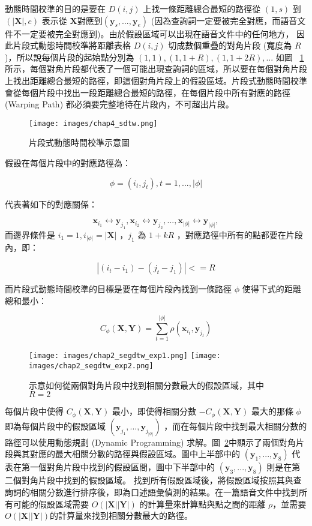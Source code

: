 動態時間校準的目的是要在 $D(i, j)$ 上找一條距離總合最短的路徑從 $(1, s)$ 到 $(|\mathbf{X}|, e)$ 表示從 $\mathbf{X}$對應到$(\mathbf{y}_s, ..., \mathbf{y}_e)$ (因為查詢詞一定要被完全對應，而語音文件不一定要被完全對應到)。由於假設區域可以出現在語音文件中的任何地方， 因此片段式動態時間校準將距離表格 $D(i, j)$ 切成數個重疊的對角片段 (寬度為 $R$)，所以說每個片段的起始點分別為 $(1, 1), (1, 1+R), (1, 1+2R),...$ 如圖 ~\ref{fig:chap4_sdtw} 所示，每個對角片段都代表了一個可能出現查詢詞的區域，所以要在每個對角片段上找出距離總合最短的路徑，即這個對角片段上的假設區域。片段式動態時間校準會從每個片段中找出一段距離總合最短的路徑，在每個片段中所有對應的路徑 (Warping Path) 都必須要完整地待在片段內，不可超出片段。

\begin{figure}
\centering
\texttt{[image: images/chap4\_sdtw.png]}
\caption{片段式動態時間校準示意圖~\cite{zhang2009unsupervised}} \label{fig:chap4_sdtw}
\end{figure}

假設在每個片段中的對應路徑為：

\[
\phi = (i_t, j_t), t = 1,...,|\phi|
\]

代表著如下的對應關係：

\[
\mathbf{x}_{i_1} \leftrightarrow \mathbf{y}_{j_1}, \mathbf{x}_{i_2} \leftrightarrow \mathbf{y}_{j_2},...,\mathbf{x}_{|\phi|} \leftrightarrow \mathbf{y}_{|\phi|},
\]
而邊界條件是 $i_1 = 1, i_{|\phi|} = |\mathbf{X}|$ ，$j_1$ 為 $1+kR$ ，對應路徑中所有的點都要在片段內，即：

\[
|(i_t-i_1)-(j_t-j_1)| <= R
\]

而片段式動態時間校準的目標是要在每個片段內找到一條路徑 $\phi$ 使得下式的距離總和最小：

\begin{equation}
C_{\phi}(\mathbf{X}, \mathbf{Y}) = \sum_{t=1}^{|\phi|} \rho(\mathbf{x}_{i_t},\mathbf{y}_{j_t})
\end{equation}

\begin{figure}
\centering
\texttt{[image: images/chap2\_segdtw\_exp1.png]}
\texttt{[image: images/chap2\_segdtw\_exp2.png]}
\caption{示意如何從兩個對角片段中找到相關分數最大的假設區域，其中 $R=2$}
\label{fig:chap2_sdtw_exp}
\end{figure}


每個片段中使得 $C_{\phi}(\mathbf{X}, \mathbf{Y})$ 最小，即使得相關分數 $-C_{\phi}(\mathbf{X}, \mathbf{Y})$ 最大的那條 $\phi$ 即為每個片段中的假設區域 $(\mathbf{y}_{j_1},...,\mathbf{y}_{j_{|\phi|}})$ ，而在每個片段中找到最大相關分數的路徑可以使用動態規劃 (Dynamic Programming) 求解。圖~\ref{fig:chap2_sdtw_exp}中顯示了兩個對角片段與其對應的最大相關分數的路徑與假設區域。圖中上半部中的 $(\mathbf{y}_1, ..., \mathbf{y}_8)$ 代表在第一個對角片段中找到的假設區間，圖中下半部中的 $(\mathbf{y}_3, ..., \mathbf{y}_8)$ 則是在第二個對角片段中找到的假設區域。 找到所有假設區域後，將假設區域按照其與查詢詞的相關分數進行排序後，即為口述語彙偵測的結果。在一篇語音文件中找到所有可能的假設區域需要 $O(|\mathbf{X}||\mathbf{Y}|)$ 的計算量來計算點與點之間的距離 $\rho$，並需要$O(|\mathbf{X}||\mathbf{Y}|)$的計算量來找到相關分數最大的路徑。

